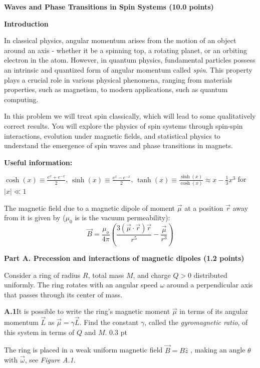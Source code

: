 {\large\textbf{Waves and Phase Transitions in Spin Systems (10.0 points)}}

\textbf{Introduction}

In classical physics, angular momentum arises from the motion of an object
around an axis - whether it be a spinning top, a rotating planet, or an
orbiting electron in the atom. However, in quantum physics, fundamental
particles possess an intrinsic and quantized form of angular momentum called
\textit{spin}. This property plays a crucial role in various physical
phenomena, ranging from materials properties, such as magnetism, to modern
applications, such as quantum computing.

In this problem we will treat spin classically, which will lead to some
qualitatively correct results. You will explore the physics of spin systems
through spin-spin interactions, evolution under magnetic fields, and
statistical physics to understand the emergence of spin waves and phase
transitions in magnets.

\textbf{Useful information:}

$\cosh(x) \equiv \frac{e^x + e^{-x}}{2}$, $\sinh(x) \equiv \frac{e^x - e^{-x}}{2}$,
$\tanh(x) \equiv \frac{\sinh(x)}{\cosh(x)} \approx x - \frac{1}{3}x^3$ for
$|x| \ll 1$

The magnetic field due to a magnetic dipole of moment $\vec{\mu}$ at a position
$\vec{r}$ away from it is given by ($\mu_0$ is is the vacuum permeability):
\begin{equation}
\vec{B} = \frac{\mu_o}{4\pi} \left( \frac{3(\vec{\mu} \cdot \vec{r})\vec{r}}{r^5} - \frac{\vec{\mu}}{r^3} \right) \tag{1}
\end{equation}

\textbf{Part A. Precession and interactions of magnetic dipoles (1.2 points)}

Consider a ring of radius $R$, total mass $M$, and charge $Q > 0$ distributed
uniformly. The ring rotates with an angular speed $\omega$ around a
perpendicular axis that passes through its center of mass.

\textbf{A.1}\quad It is possible to write the ring's magnetic moment
$\vec{\mu}$ in terms of its angular momentum $\vec{L}$ as
$\vec{\mu} = \gamma\vec{L}$. Find the constant $\gamma$, called the
\textit{gyromagnetic ratio}, of this system in terms of $Q$ and $M$.
\hfill 0.3 pt

The ring is placed in a weak uniform magnetic field $\vec{B} = B\hat{z}$ ,
making an angle $\theta$ with $\vec{\omega}$, see \textit{Figure A.1}.


